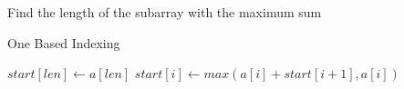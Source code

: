 \documentclass[12pt]{article}
\begin{document}
\begin{algorithm}

  \caption{Find the length of the subarray with the maximum sum}
  
  \begin{algorithmic}[1]
    \Ensure One Based Indexing
    \Statex
    
    
        \Statex
        
        \State $start[len] \gets a[len]$
            \State $start[i] \gets max(a[i] + start[i+1], a[i])$
        \EndFor
        
        \State {}
    \EndFunction
  \end{algorithmic}
  
\end{algorithm}
\end{document}
